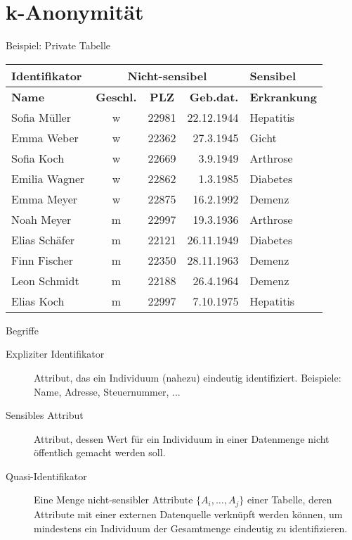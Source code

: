 \section{k-Anonymität}

\begin{frame}{Beispiel: Private Tabelle}
	\begin{center}
		\begin{tabular}{|l|c|c|r|l|}
		\hline \textbf{Identifikator} & \multicolumn{3}{c|}{\textbf{Nicht-sensibel}} & \textbf{Sensibel} \\ 
		\hline \textbf{Name} & \textbf{Geschl.} & \textbf{PLZ} & \textbf{Geb.dat.} & \textbf{Erkrankung} \\
		\hline \hline Sofia Müller & w & 22981 & 22.12.1944 & Hepatitis \\ 
		\hline Emma Weber & w & 22362 & 27.3.1945 & Gicht \\
		\hline Sofia Koch & w & 22669 & 3.9.1949 & Arthrose \\ 
		\hline Emilia Wagner & w & 22862 & 1.3.1985 & Diabetes \\ 
		\hline Emma Meyer & w & 22875 & 16.2.1992 & Demenz \\  
		\hline Noah Meyer & m & 22997 & 19.3.1936 & Arthrose \\ 
		\hline Elias Schäfer & m & 22121 & 26.11.1949 & Diabetes \\ 
		\hline Finn Fischer & m & 22350 & 28.11.1963 & Demenz \\ 
		\hline Leon Schmidt & m & 22188 & 26.4.1964 & Demenz \\ 
		\hline Elias Koch & m & 22997 & 7.10.1975 & Hepatitis \\ 
		\hline 
		\end{tabular}
	\end{center}
\end{frame}

\begin{frame}{Begriffe}
	\begin{description}
	\item[Expliziter Identifikator] Attribut, das ein Individuum (nahezu) eindeutig identifiziert. Beispiele: Name, Adresse, Steuernummer, ...
	
	\item[Sensibles Attribut] Attribut, dessen Wert für ein Individuum in einer Datenmenge nicht öffentlich gemacht werden soll.
	
	\item[Quasi-Identifikator] Eine Menge nicht-sensibler Attribute \(\{A_i, \dots, A_j\}\) einer Tabelle, deren Attribute mit einer externen Datenquelle verknüpft werden können, um mindestens ein Individuum der Gesamtmenge eindeutig zu identifizieren.
	\end{description}
\end{frame}

